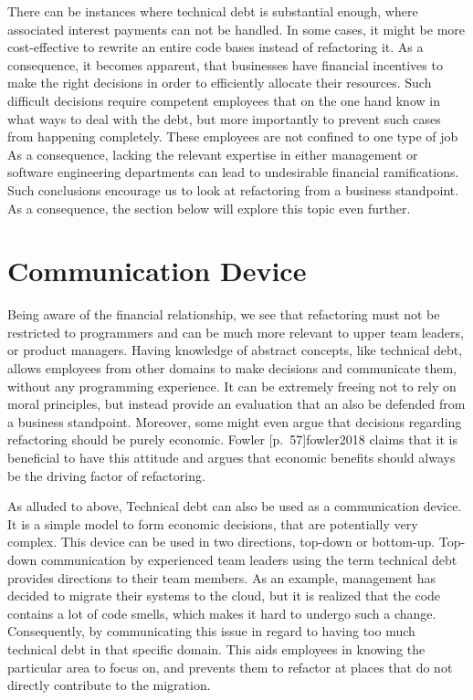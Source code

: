 There can be instances where technical debt is substantial enough, 
	where associated interest payments can not be handled. 
In some cases, it might be more cost-effective to 
	rewrite an entire code bases instead of refactoring it.  
As a consequence, it becomes apparent, that businesses have financial incentives to make the right decisions in order to efficiently allocate their resources.
Such difficult decisions require 
	competent employees that on the one hand know in what ways to deal with the debt, but more importantly to prevent such cases from happening completely.
These employees are not confined to one type of job
As a consequence, lacking the relevant expertise in either management or software engineering departments can lead to undesirable financial ramifications. 
Such conclusions encourage us to look at refactoring from a business standpoint. As a consequence, the section below will explore this topic even further.

\section{Communication Device}
Being aware of the financial relationship, 
	we see that refactoring must not be restricted to programmers and can be much more relevant to upper team leaders, or product managers.
Having knowledge of abstract concepts, like technical debt,
	allows employees from other domains
	to make decisions and communicate them, without any programming experience.
It can be extremely freeing not to rely on moral principles, 
	but instead provide an evaluation that an also be defended from a business standpoint.
Moreover, some might even argue that decisions regarding refactoring should be purely economic.
Fowler [p.~57]{fowler2018} claims 
	that it is beneficial to have this attitude and argues that economic benefits
	should always be the driving factor of refactoring.

As alluded to above, Technical debt can also be used as a communication device. 
It is a simple model to form economic decisions, 
	that are potentially very complex.
This device can be used in two directions, top-down or bottom-up.
Top-down communication by experienced team leaders 
	using the term technical debt provides directions to their team members.
As an example, management has decided to migrate their systems to the cloud, 
	but it is realized that the code contains a lot of code smells, 
	which makes it hard to undergo such a change. 
Consequently, by communicating this issue in regard to having too much technical debt in that specific domain.
This aids employees in knowing the particular area 
	to focus on, and prevents them to refactor at places 
	that do not directly contribute to the migration.

